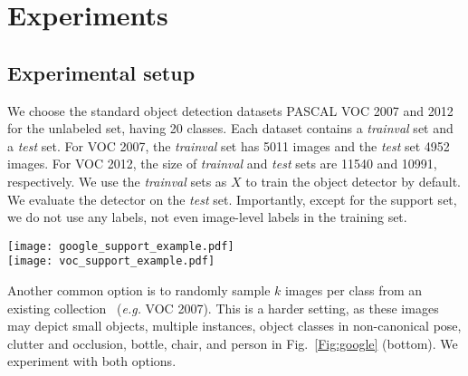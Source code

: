 \section{Experiments}
\label{sec:exp}

\subsection{Experimental setup}
\label{Sec:setup}

We choose the standard object detection datasets PASCAL VOC 2007 and 2012~\cite{pascalvoc} {for the unlabeled set}, having 20 classes. Each dataset contains a \emph{trainval} set and a \emph{test} set. For VOC 2007, the \emph{trainval} set has 5011 images and the \emph{test} set 4952 images. For VOC 2012, the size of \emph{trainval} and \emph{test} sets are 11540 and 10991, respectively.
{We use the \emph{trainval} sets as $X$ to train the object detector by default.  We evaluate the detector on the \emph{test} set.}
{Importantly, except for the support set, we do not use any labels, not even image-level labels in the training set.}


\begin{figure*}[t]
	\centering
	\texttt{[image: google\_support\_example.pdf]} \\[3pt]
	\texttt{[image: voc\_support\_example.pdf]}
	\caption{\small (Top) examples of top-ranking web images, using class names as queries. (Bottom) random selection of images from PASCAL VOC 2007.  
	}
	\label{Fig:google}
\end{figure*}



{Another common
	option
	is to randomly
	sample $k$ images per class
	from an existing collection~\cite{ShHX15,marvaniya2012drawing} (\emph{e.g.} VOC 2007). This is a harder setting,
	as these images may depict small objects, multiple instances, object classes in non-canonical pose, clutter and occlusion, \eg bottle, chair, and person in Fig.~\ref{Fig:google} (bottom). }
We experiment with both options.



